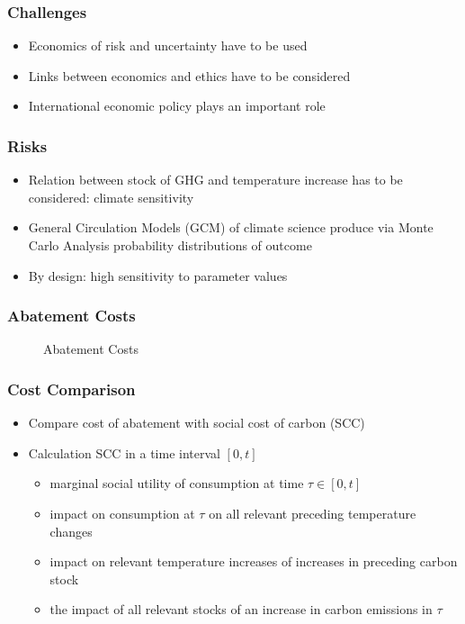 \begin{frame}
\frametitle{Challenges}
\begin{itemize}
\item<1-> Economics of risk and uncertainty have to be used
\item<2-> Links between economics and ethics have to be considered
\item<3-> International economic policy plays an important role
\end{itemize}
\end{frame}

\begin{frame}
\frametitle{Risks}
\begin{itemize}
\item<1-> Relation between stock of GHG and temperature increase has to be considered: climate sensitivity
\item<2-> General Circulation Models (GCM) of climate science produce via Monte Carlo Analysis probability distributions of outcome
\item<3-> By design: high sensitivity to parameter values
\end{itemize}
\end{frame}

\begin{frame}\frametitle{Abatement Costs}
\begin{center}
\begin{figure}[h!]
\centering
{} %
\caption{Abatement Costs}
\label{fig:abatement}
\end{figure}
\end{center}
\end{frame}



\begin{frame}
\frametitle{Cost Comparison}
\begin{itemize}
\item<1-> Compare cost of abatement with social cost of carbon (SCC)
\item<2-> Calculation SCC in a time interval $[0,t]$
\begin{itemize}
\item marginal social utility of consumption at time $\tau \in [0,t]$
\item impact on consumption at $\tau$ on all relevant preceding temperature changes
\item impact on relevant temperature increases of increases in preceding carbon stock
\item the impact of all relevant stocks of an increase in carbon emissions in $\tau$
\end{itemize}
\end{itemize}
\end{frame}

